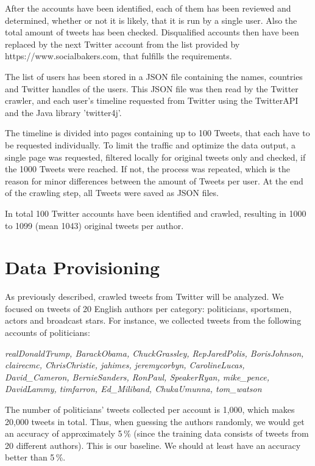 \documentclass[journal, a4paper, 12pt]{IEEEtran}
\begin{document}
After the accounts have been identified, each of them has been reviewed and determined, whether or not it is likely, that it is run by a single user. Also the total amount of tweets has been checked. Disqualified accounts then have been replaced by the next Twitter account from the list provided by https://www.socialbakers.com, that fulfills the requirements.

The list of users has been stored in a JSON file containing the names, countries and Twitter handles of the users. This JSON file was then read by the Twitter crawler, and each user's timeline requested from Twitter using the TwitterAPI and the Java library 'twitter4j'. 

The timeline is divided into pages containing up to 100 Tweets, that each have to be requested individually. To limit the traffic and optimize the data output, a single page was requested, filtered locally for original tweets only and checked, if the 1000 Tweets were reached. If not, the process was repeated, which is the reason for minor differences between the amount of Tweets per user. At the end of the crawling step, all Tweets were saved as JSON files. 

In total 100 Twitter accounts have been identified and crawled, resulting in 1000 to 1099 (mean 1043) original tweets per author.  

\section{Data Provisioning}
\label{sec:provisioning}
\vspace{-2mm}
As previously described, crawled tweets from Twitter will be analyzed. We focused on tweets of 20 English authors per category: politicians, sportsmen, actors and broadcast stars. For instance, we collected tweets from the following accounts of politicians:

\footnotesize
\textit{
realDonaldTrump, BarackObama, ChuckGrassley, RepJaredPolis, BorisJohnson, clairecmc, ChrisChristie, jahimes, jeremycorbyn, CarolineLucas, David\_Cameron, BernieSanders, RonPaul, SpeakerRyan, mike\_pence, DavidLammy, timfarron, Ed\_Miliband, ChukaUmunna, tom\_watson
}
\normalsize

The number of politicians' tweets collected per account is 1,000, which makes 20,000 tweets in total. Thus, when guessing the authors randomly, we would get an accuracy of approximately 5\,\% (since the training data consists of tweets from 20 different authors). This is our baseline. We should at least have an accuracy better than 5\,\%.
\end{document}
